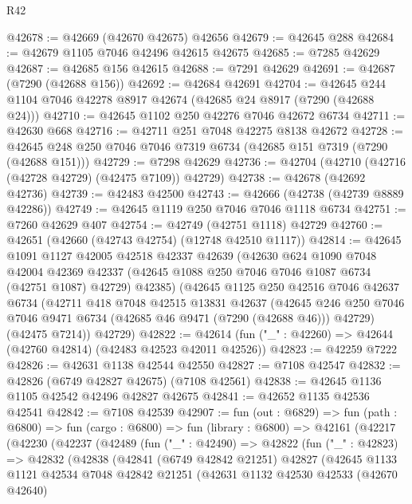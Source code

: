 \begin{lexlean}{R42}
\begin{coremodule}
{@42678 := @42669 (@42670 @42675) @42656
@42679 := @42645 @288
@42684 := @42679 @1105 @7046 @42496 @42615 @42675
@42685 := @7285 @42629
@42687 := @42685 @156 @42615
@42688 := @7291 @42629
@42691 := @42687 (@7290 (@42688 @156))
@42692 := @42684 @42691
@42704 := @42645 @244 @1104 @7046 @42278 @8917 @42674 (@42685 @24 @8917 (@7290 (@42688 @24)))
@42710 := @42645 @1102 @250 @42276 @7046 @42672 @6734
@42711 := @42630 @668
@42716 := @42711 @251 @7048 @42275 @8138 @42672
@42728 := @42645 @248 @250 @7046 @7046 @7319 @6734 (@42685 @151 @7319 (@7290 (@42688 @151)))
@42729 := @7298 @42629
@42736 := @42704 (@42710 (@42716 (@42728 @42729) (@42475 @7109)) @42729)
@42738 := @42678 (@42692 @42736)
@42739 := @42483 @42500
@42743 := @42666 (@42738 (@42739 @8889 @42286))
@42749 := @42645 @1119 @250 @7046 @7046 @1118 @6734
@42751 := @7260 @42629 @407
@42754 := @42749 (@42751 @1118) @42729
@42760 := @42651 (@42660 (@42743 @42754) (@12748 @42510 @1117))
@42814 := @42645
    @1091
    @1127
    @42005
    @42518
    @42337
    @42639
    (@42630
      @624
      @1090
      @7048
      @42004
      @42369
      @42337
      (@42645 @1088 @250 @7046 @7046 @1087 @6734 (@42751 @1087) @42729)
      @42385)
    (@42645
      @1125
      @250
      @42516
      @7046
      @42637
      @6734
      (@42711
        @418
        @7048
        @42515
        @13831
        @42637
        (@42645 @246 @250 @7046 @7046 @9471 @6734 (@42685 @46 @9471 (@7290 (@42688 @46))) @42729)
        (@42475 @7214))
      @42729)
@42822 := @42614 (fun ("_" : @42260) => @42644 (@42760 @42814) (@42483 @42523 @42011 @42526))
@42823 := @42259 @7222
@42826 := @42631 @1138 @42544 @42550
@42827 := @7108 @42547
@42832 := @42826 (@6749 @42827 @42675) (@7108 @42561)
@42838 := @42645 @1136 @1105 @42542 @42496 @42827 @42675
@42841 := @42652 @1135 @42536 @42541
@42842 := @7108 @42539
@42907 := fun (out : @6829) =>
  fun (path : @6800) =>
  fun (cargo : @6800) =>
  fun (library : @6800) =>
  @42161
    (@42217
      (@42230
        (@42237
          (@42489
            (fun ("_" : @42490) =>
            @42822
              (fun ("_" : @42823) =>
              @42832
                (@42838
                  (@42841
                    (@6749 @42842 @21251)
                    @42827
                    (@42645
                      @1133
                      @1121
                      @42534
                      @7048
                      @42842
                      @21251
                      (@42631
                        @1132
                        @42530
                        @42533
                        (@42670 @42640)
}
\end{coremodule}
\end{lexlean}
